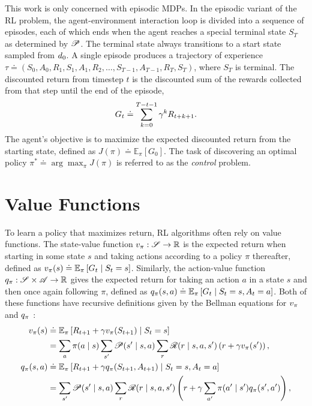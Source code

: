 This work is only concerned with episodic MDPs. In the episodic variant of the RL problem, the agent-environment interaction loop is divided into a sequence of episodes, each of which ends when the agent reaches a special terminal state $S_T$ as determined by $\mathscr{P}$. The terminal state always transitions to a start state sampled from $d_{0}$. A single episode produces a trajectory of experience $\tau \doteq (S_0, A_0, R_1, S_1, A_1, R_2, \dots, S_{T-1}, A_{T-1}, R_T, S_T)$, where $S_T$ is terminal. The discounted return from timestep $t$ is the discounted sum of the rewards collected from that step until the end of the episode,
\begin{equation}
    G_t \doteq \sum_{k=0}^{T - t - 1} \gamma^k R_{t + k + 1}.
    \label{eq:return}
\end{equation}
The agent's objective is to maximize the expected discounted return from the starting state, defined as $J(\pi) \doteq \mathbb{E}_\pi \left[ G_0 \right]$. The task of discovering an optimal policy $\pi^* \doteq \arg\max_\pi J(\pi)$ is referred to as the \textit{control} problem.

\section{Value Functions}
To learn a policy that maximizes return, RL algorithms often rely on value functions. The state-value function $v_{\pi}: \mathscr{S} \to \mathbb{R}$ is the expected return when starting in some state $s$ and taking actions according to a policy $\pi$ thereafter, defined as $v_{\pi}(s) \doteq \mathbb{E}_\pi \left[ G_t \mid S_t = s \right] $. Similarly, the action-value function $q_{\pi}: \mathscr{S} \times \mathscr{A} \to \mathbb{R}$ gives the expected return for taking an action $a$ in a state $s$ and then once again following $\pi$, defined as $ q_{\pi}(s, a) \doteq \mathbb{E}_\pi \left[ G_t \mid S_t = s, A_t = a \right] $. 
Both of these functions have recursive definitions given by the Bellman equations for $v_{\pi}$ and $q_{\pi}$ : 
\begin{align}
    v_{\pi}(s) &\doteq \operatorname{\mathbb{E}}_\pi \left[ R_{t+1} + \gamma v_{\pi}(S_{t+1}) \mid S_t = s \right] \nonumber \\
    &= \sum_{a} \pi(a \mid s) \sum_{s'} \mathscr{P}(s' \mid s, a) \sum_{r} \mathscr{R}(r \mid s, a, s') \left( r + \gamma v_{\pi}(s') \right),
    \label{eq:bellman_v} \\
    q_{\pi}(s, a) &\doteq \operatorname{\mathbb{E}}_\pi \left[ R_{t+1} + \gamma q_{\pi}(S_{t+1}, A_{t+1}) \mid S_t = s, A_t = a \right] \nonumber \\
    &= \sum_{s'} \mathscr{P}(s' \mid s, a) \sum_{r} \mathscr{R}(r \mid s, a, s') \left( r + \gamma \sum_{a'} \pi(a' \mid s') q_{\pi}(s', a') \right),
    \label{eq:bellman_q}
\end{align}

